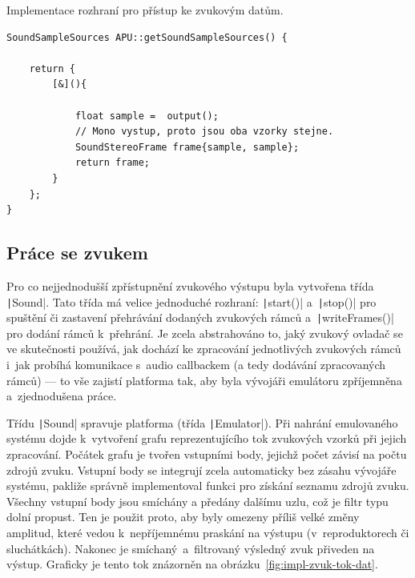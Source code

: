 \begin{listing}
	\caption{Implementace rozhraní pro přístup ke zvukovým datům.}
	\label{list:use-konfigurace-audia}
	\begin{verbatim}
SoundSampleSources APU::getSoundSampleSources() {
	
	return {
		[&](){
			
			float sample =  output();
			// Mono vystup, proto jsou oba vzorky stejne.
			SoundStereoFrame frame{sample, sample};
			return frame;
		}
	};
}
	\end{verbatim}
\end{listing}

\subsection{Práce se zvukem}
Pro co nejjednodušší zpřístupnění zvukového výstupu byla vytvořena třída \texttt|Sound|. Tato třída má velice jednoduché rozhraní: \texttt|start()| a~\texttt|stop()| pro spuštění či zastavení přehrávání dodaných zvukových rámců a~\texttt|writeFrames()| pro dodání rámců k~přehrání. Je zcela abstrahováno to, jaký zvukový ovladač se ve skutečnosti používá, jak dochází ke zpracování jednotlivých zvukových rámců i~jak probíhá komunikace s~audio callbackem (a tedy dodávání zpracovaných rámců) --- to vše zajistí platforma tak, aby byla vývojáři emulátoru zpříjemněna a~zjednodušena práce.

Třídu \texttt|Sound| spravuje platforma (třída \texttt|Emulator|). Při nahrání emulovaného systému dojde k~vytvoření grafu reprezentujícího tok zvukových vzorků při jejich zpracování. Počátek grafu je tvořen vstupními body, jejichž počet závisí na počtu zdrojů zvuku. Vstupní body se integrují zcela automaticky bez zásahu vývojáře systému, pakliže správně implementoval funkci pro získání seznamu zdrojů zvuku. Všechny vstupní body jsou smíchány a předány dalšímu uzlu, což je filtr typu dolní propust. Ten je použit proto, aby byly omezeny příliš velké změny amplitud, které vedou k~nepříjemnému praskání na výstupu (v~reproduktorech či sluchátkách). Nakonec je smíchaný~a~filtrovaný výsledný zvuk přiveden na výstup. Graficky je tento tok znázorněn na obrázku~\ref{fig:impl-zvuk-tok-dat}.

